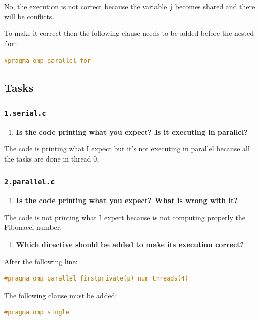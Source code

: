 \documentclass[a4paper]{article}
\begin{document}
No, the execution is not correct because the variable \verb|j| becomes shared and there will be conflicts.

To make it correct then the following clause needs to be added before the nested \verb|for|:

\begin{lstlisting}[language=C]
#pragma omp parallel for
\end{lstlisting}

\subsection{Tasks}
\subsubsection{\texttt{1.serial.c}}

\begin{enumerate}
	\item \textbf{Is the code printing what you expect? Is it executing in parallel?}
\end{enumerate}

The code is printing what I expect but it's not executing in parallel because all the tasks are done in thread 0.

\subsubsection{\texttt{2.parallel.c}}
\begin{enumerate}
	\item \textbf{Is the code printing what you expect? What is wrong with it?}
\end{enumerate}

The code is not printing what I expect because is not computing properly the Fibonacci number. 

\begin{enumerate}[resume]
	\item \textbf{Which directive should be added to make its execution correct?}
\end{enumerate}

After the following line:
\begin{lstlisting}[language=C]
#pragma omp parallel firstprivate(p) num_threads(4)
\end{lstlisting}

The following clause must be added:
\begin{lstlisting}[language=C]
#pragma omp single
\end{lstlisting}
\end{document}
